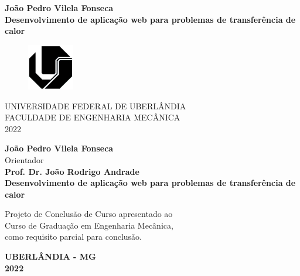 \documentclass[12pt,a4paper]{article}
\begin{document}
\begin{titlepage}
    \begin{center}
        \textbf{João Pedro Vilela Fonseca\\}
        \vspace*{\fill}
        \textbf{\Large Desenvolvimento de aplicação web para problemas de transferência de calor\\}
        \vspace*{\fill}
        \begin{figure}[h]
            \center
            \includegraphics[width=2cm]{Ufu.jpg}
        \end{figure}
        UNIVERSIDADE FEDERAL DE UBERLÂNDIA\\
        \vspace{0.3cm}
        FACULDADE DE ENGENHARIA MECÂNICA\\
        \vspace{0.3cm}
        2022
    \end{center}
\end{titlepage}

\begin{titlepage}
    \begin{center}
        \textbf{\large João Pedro Vilela Fonseca\\}
        \vspace*{\fill}
        Orientador\\
        \textbf{\large Prof. Dr. João Rodrigo Andrade\\}
        \vspace*{\fill}
        \textbf{\Large Desenvolvimento de aplicação web para problemas de transferência de calor\\}
        \vspace*{\fill}
        \begin{adjustwidth}{7cm}{0cm}
            Projeto de Conclusão de Curso apresentado ao\\Curso de Graduação em Engenharia Mecânica,\\como requisito parcial para conclusão.
        \end{adjustwidth}
        \vspace*{\fill}
        \textbf{UBERLÂNDIA - MG\\}
        \textbf{2022}
    \end{center}
\end{titlepage}
\end{document}
